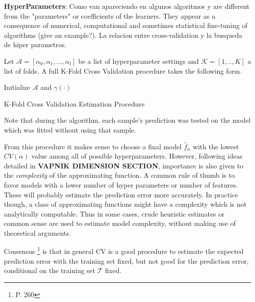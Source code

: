  
 \textbf{HyperParameters}:
 Como van apareciendo en algunos algoritmos y are different from the "parameters" or coefficients of the learners. They appear as a consequence of numerical, computational and sometimes statistical fine-tuning of algorithms (give an example?). 
 La relacion entre cross-validation y la busqueda de hiper parametros. 
 
 \textit{}
 
 \textit{} 
 
 Let $\mathcal{A} = [\alpha_0, \alpha_1,..., \alpha_l   ]$ be a list of hyperparameter settings and  $\mathcal{K} =[1,..,K]$ a list of folds.  A full K-Fold Cross Validation procedure takes the following form.
 
 \begin{algorithm}%
 	\SetAlgoLined
 	Initialize $\mathcal{A}$ and $\gamma(\cdot)$\;
 \caption{K-Fold Cross Validation Estimation Procedure}
\end{algorithm}

Note that during the algorithm, each sample's prediction was tested on the model which was fitted without using that sample. 

From this procedure it makes sense to choose a final  model $\hat{f}_\alpha$ with the lowest $CV(\alpha)$ value among all of possible hyperparameters. However, following ideas detailed in \textbf{VAPNIK DIMENSION SECTION}, importance is also given to the \textit{complexity} of the approximating function. A common rule of thumb is to favor models with a lower number of hyper parameters or number of features. These will probably estimate the prediction error more accurately. In practice though, a class of approximating functions might have a complexity which is not analytically computable. Thus in some cases, crude heuristic estimates or common sense are used to estimate model complexity, without making use of theoretical arguments.


Consensus \footnote{\cite{hastie-elemstatslearn} P. 260} is that in general CV is a good procedure to estimate the expected prediction error with the training set fixed, but not good for the prediction error, conditional on the training set $\mathcal{T}$ fixed.






